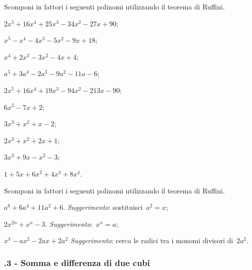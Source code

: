 \begin{esercizio}[\Ast]
\label{ese:17.14}
Scomponi in fattori i seguenti polinomi utilizzando il teorema di
Ruffini.
\begin{multicols}{2}
 \begin{enumeratea}
 \item $2x^{5}+16x^{4}+25x^{3}-34x^{2}-27x+90$;
\item $x^{5}-x^{4}-4x^{3}-5x^{2}-9x+18$;
\item $x^{4}+2x^{3}-3x^{2}-4x+4$;
\item $a^{5}+3a^{4}-2a^{3}-9a^{2}-11a-6$;
\item $2x^{5}+16x^{4}+19x^{3}-94x^{2}-213x-90$;
\item $6x^{2}-7x+2$;
\item $3x^{3}+x^{2}+x-2$;
\item $2x^{3}+x^{2}+2x+1$;
\item $3x^{3}+9x-x^{2}-3$;
\item $1+5x+6x^{2}+4x^{3}+8x^{4}$.
 \end{enumeratea}
\end{multicols}
\end{esercizio}

\begin{esercizio}[\Ast]
\label{ese:17.15}
Scomponi in fattori i seguenti polinomi utilizzando il teorema di
Ruffini.

 \begin{enumeratea}
 \item $a^{6}+6a^{4}+11a^{2}+6$. \emph{Suggerimento}: sostituisci~$a^{2}=x$;
\item $2x^{2n}+x^{n}-3$. \emph{Suggerimento}:~$x^{n}=a$;
\item $x^{3}-ax^{2}-2ax+2a^{2}$ \emph{Suggerimento}: cerca le radici tra i
monomi divisori di~$2a^{2}$.
 \end{enumeratea}
\end{esercizio}

\subsubsection*{\thechapter.3 - Somma e differenza di due cubi}

